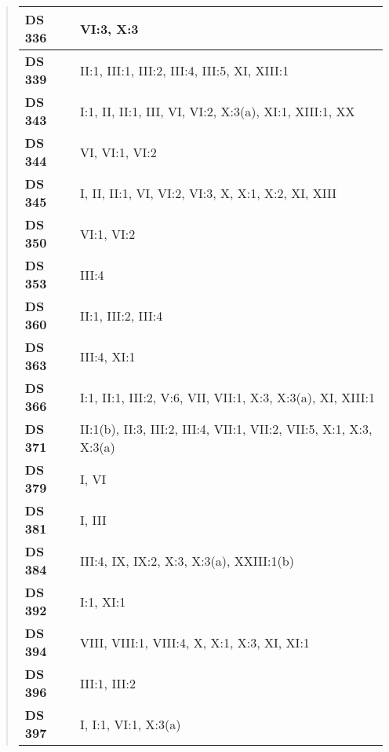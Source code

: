 \begin{quote}
\begin{xltabular}{\linewidth}{ l | X }
        \textbf {DS 336} & VI:3, X:3 \\ \hline
    
        \textbf {DS 339} & II:1, III:1, III:2, III:4, III:5, XI, XIII:1 \\ \hline
    
        \textbf {DS 343} & I:1, II, II:1, III, VI, VI:2, X:3(a), XI:1, XIII:1, XX \\ \hline
    
        \textbf {DS 344} & VI, VI:1, VI:2 \\ \hline
    
        \textbf {DS 345} & I, II, II:1, VI, VI:2, VI:3, X, X:1, X:2, XI, XIII \\ \hline
    
        \textbf {DS 350} & VI:1, VI:2 \\ \hline
    
        \textbf {DS 353} & III:4 \\ \hline
    
        \textbf {DS 360} & II:1, III:2, III:4 \\ \hline
    
        \textbf {DS 363} & III:4, XI:1 \\ \hline
    
        \textbf {DS 366} & I:1, II:1, III:2, V:6, VII, VII:1, X:3, X:3(a), XI, XIII:1 \\ \hline
    
        \textbf {DS 371} & II:1(b), II:3, III:2, III:4, VII:1, VII:2, VII:5, X:1, X:3, X:3(a) \\ \hline
    
        \textbf {DS 379} & I, VI \\ \hline
    
        \textbf {DS 381} & I, III \\ \hline
    
        \textbf {DS 384} & III:4, IX, IX:2, X:3, X:3(a), XXIII:1(b) \\ \hline
    
        \textbf {DS 392} & I:1, XI:1 \\ \hline
    
        \textbf {DS 394} & VIII, VIII:1, VIII:4, X, X:1, X:3, XI, XI:1 \\ \hline
    
        \textbf {DS 396} & III:1, III:2 \\ \hline
    
        \textbf {DS 397} & I, I:1, VI:1, X:3(a) \\ \hline
    

\end{xltabular}
\end{quote}
